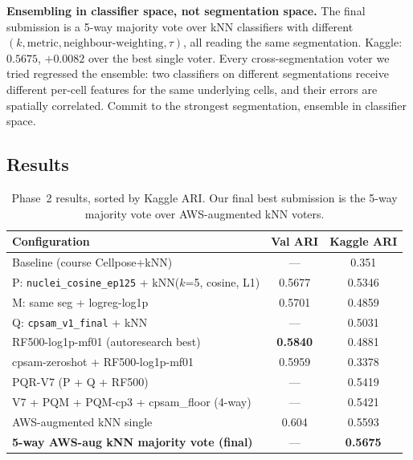 \documentclass[a4paper,11pt]{article}
\begin{document}
\textbf{Ensembling in classifier space, not segmentation space.} The final submission is a 5-way majority vote over kNN classifiers with different $(k, \text{metric}, \text{neighbour-weighting}, \tau)$, all reading the same segmentation. Kaggle: $0.5675$, $+0.0082$ over the best single voter. Every cross-segmentation voter we tried regressed the ensemble: two classifiers on different segmentations receive different per-cell features for the same underlying cells, and their errors are spatially correlated. Commit to the strongest segmentation, ensemble in classifier space.


\subsection{Results}

\begin{table}[htbp]
\centering
\caption{Phase~2 results, sorted by Kaggle ARI. Our final best submission is the 5-way majority vote over AWS-augmented kNN voters.}
\label{tab:phase2}
\small
\begin{tabular}{@{}lcc@{}}
\toprule
\textbf{Configuration} & \textbf{Val ARI} & \textbf{Kaggle ARI} \\
\midrule
Baseline (course Cellpose+kNN)                             & ---    & 0.351 \\
\midrule
P: \texttt{nuclei\_cosine\_ep125} + kNN($k$=5, cosine, L1) & 0.5677 & 0.5346 \\
M: same seg + logreg-log1p                                 & 0.5701 & 0.4859 \\
Q: \texttt{cpsam\_v1\_final} + kNN                         & ---    & 0.5031 \\
RF500-log1p-mf01 (autoresearch best)                       & \textbf{0.5840} & 0.4881 \\
cpsam-zeroshot + RF500-log1p-mf01                          & 0.5959 & 0.3378 \\
\midrule
PQR-V7 (P + Q + RF500)                                     & ---    & 0.5419 \\
V7 + PQM + PQM-cp3 + cpsam\_floor (4-way)                  & ---    & 0.5421 \\
\midrule
AWS-augmented kNN single                                   & 0.604  & 0.5593 \\
\textbf{5-way AWS-aug kNN majority vote (final)}            & ---    & \textbf{0.5675} \\
\bottomrule
\end{tabular}
\end{table}
\end{document}
